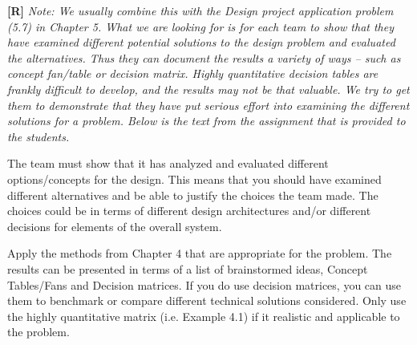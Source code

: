 \begin{enumerate}
  \begin{onlysolution}
    \textbf{[R]}
    \itshape
    \emph{Note:} We usually combine this with the Design project application problem (5.7) 
    in Chapter 5. What we are looking for is for each team to show that they have examined 
    different potential solutions to the design problem and evaluated the alternatives. 
    Thus they can document the results a variety of ways – such as concept fan/table or 
    decision matrix. Highly quantitative decision tables are frankly difficult to develop, 
    and the results may not be that valuable. We try to get them to demonstrate that they 
    have put serious effort into examining the different solutions for a problem. Below is 
    the text from the assignment that is provided to the students.

    The team must show that it has analyzed and evaluated different options/concepts for the 
    design. This means that you should have examined different alternatives and be able to 
    justify the choices the team made. The choices could be in terms of different design 
    architectures and/or different decisions for elements of the overall system.
    
    Apply the methods from Chapter 4 that are appropriate for the problem. The results can be 
    presented in terms of a list of brainstormed ideas, Concept Tables/Fans and Decision 
    matrices. If you do use decision matrices, you can use them to benchmark or compare different 
    technical solutions considered. Only use the highly quantitative matrix (i.e. Example 4.1) if 
    it realistic and applicable to the problem.
  \end{onlysolution}

\end{enumerate}

